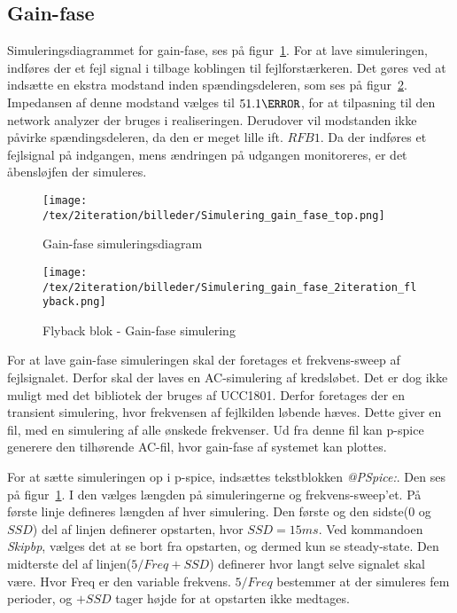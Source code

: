 
\subsection{Gain-fase}
Simuleringsdiagrammet for gain-fase, ses på figur~\ref{fig:sim_gain_fase_top}. For at lave simuleringen, indføres der et fejl signal i tilbage koblingen til fejlforstærkeren. Det gøres ved at indsætte en ekstra modstand inden spændingsdeleren, som ses på figur~\ref{fig:sim_gain_fase_2iteration}. Impedansen af denne modstand vælges til $51.1\ohm$, for at tilpasning til den network analyzer der bruges i realiseringen. Derudover vil modstanden ikke påvirke spændingsdeleren, da den er meget lille ift. $RFB1$. Da der indføres et fejlsignal på indgangen, mens ændringen på udgangen monitoreres, er det åbensløjfen der simuleres. 

\begin{figure}[H]
	\center
	\texttt{[image: /tex/2iteration/billeder/Simulering\_gain\_fase\_top.png]}
	\caption{Gain-fase simuleringsdiagram}
	\label{fig:sim_gain_fase_top}
\end{figure}

\begin{figure}[H]
	\center
	\texttt{[image: /tex/2iteration/billeder/Simulering\_gain\_fase\_2iteration\_flyback.png]}
	\caption{Flyback blok - Gain-fase simulering}
	\label{fig:sim_gain_fase_2iteration}
\end{figure}

For at lave gain-fase simuleringen skal der foretages et frekvens-sweep af fejlsignalet. Derfor skal der laves en AC-simulering af kredsløbet. Det er dog ikke muligt med det bibliotek der bruges af UCC1801. Derfor foretages der en transient simulering, hvor frekvensen af fejlkilden løbende hæves. Dette giver en fil, med en simulering af alle ønskede frekvenser. Ud fra denne fil kan p-spice generere den tilhørende AC-fil, hvor gain-fase af systemet kan plottes. 

For at sætte simuleringen op i p-spice, indsættes tekstblokken \textit{@PSpice:}. Den ses på figur~\ref{fig:sim_gain_fase_top}. I den vælges længden på simuleringerne og frekvens-sweep'et. På første linje defineres længden af hver simulering. Den første og den sidste($0$ og $SSD$) del af linjen definerer opstarten, hvor $SSD=15ms$. Ved kommandoen \textit{Skipbp}, vælges det at se bort fra opstarten, og dermed kun se steady-state. Den midterste del af linjen($5/Freq+SSD$) definerer hvor langt selve signalet skal være. Hvor Freq er den variable frekvens. $5/Freq$ bestemmer at der simuleres fem perioder, og $+SSD$ tager højde for at opstarten ikke medtages. 

